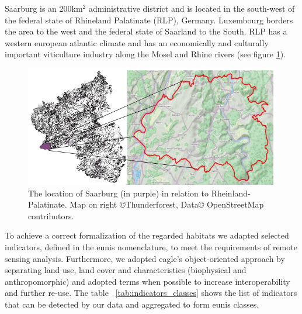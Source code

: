 \documentclass[authoryear,preprint,12pt,number]{elsarticle}
\begin{document}
Saarburg is an 200km$^{2}$ administrative district and is located in the
south-west of the federal state of Rhineland Palatinate (RLP), Germany.
Luxembourg borders the area to the west and the federal state of Saarland to
the South. RLP has a western european atlantic climate and has an economically
and culturally important viticulture industry along the Mosel and Rhine rivers
(see figure \ref{fig:study_area}).
\begin{figure}
    \includegraphics[width=\textwidth]{diagrams/study_area_closeup.png}
    \caption{The location of Saarburg (in purple) in relation to
    Rheinland-Palatinate. Map on right \copyright Thunderforest, Data\copyright
    OpenStreetMap contributors.}
\label{fig:study_area}
\end{figure}
To achieve a correct formalization of the regarded habitats we adapted selected
indicators, defined in the \gls{eunis} nomenclature, to meet the 
requirements of
remote sensing analysis.
Furthermore, we adopted \gls{eagle}'s object-oriented approach by 
separating land 
use, land cover and characteristics (biophysical and anthropomorphic) and 
adopted terms when possible to increase interoperability and further re-use. 
The table ~\ref{tab:indicators_classes} shows the list of indicators that can 
be detected by our data and aggregated to form \gls{eunis} classes. 
\end{document}
